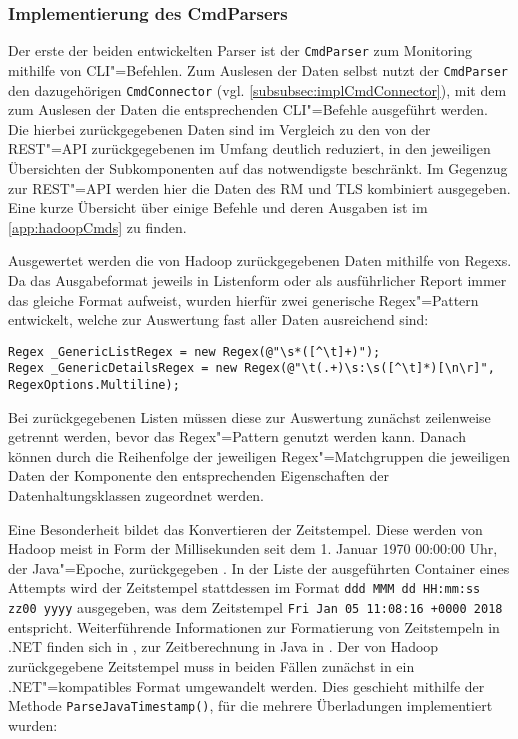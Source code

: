 \subsubsection{Implementierung des CmdParsers}
\label{subsubsec:implCmdParser}

Der erste der beiden entwickelten Parser ist der \texttt{CmdParser} zum Monitoring mithilfe von \gls{CLI}"=Befehlen.
Zum Auslesen der Daten selbst nutzt der \texttt{CmdParser} den dazugehörigen \texttt{CmdConnector} (vgl. \cref{subsubsec:implCmdConnector}), mit dem zum Auslesen der Daten die entsprechenden \gls{CLI}"=Befehle ausgeführt werden.
Die hierbei zurückgegebenen Daten sind im Vergleich zu den von der REST"=API zurückgegebenen im Umfang deutlich reduziert, in den jeweiligen Übersichten der Subkomponenten auf das notwendigste beschränkt.
Im Gegenzug zur REST"=API werden hier die Daten des \gls{RM} und \gls{TLS} kombiniert ausgegeben.
Eine kurze Übersicht über einige Befehle und deren Ausgaben ist im \cref{app:hadoopCmds} zu finden.

Ausgewertet werden die von Hadoop zurückgegebenen Daten mithilfe von \glspl{Regex}.
Da das Ausgabeformat jeweils in Listenform oder als ausführlicher Report immer das gleiche Format aufweist, wurden hierfür zwei generische Regex"=Pattern entwickelt, welche zur Auswertung fast aller Daten ausreichend sind:

\begin{lstlisting}[label=lst:cmdRegexPattern,style=cs,
caption={[Implementierte \glsentryshort{Regex}"=Pattern des CmdParsers]
    Implementierte \acrshort{Regex}"=Pattern des \texttt{CmdParser}s}]
Regex _GenericListRegex = new Regex(@"\s*([^\t]+)");
Regex _GenericDetailsRegex = new Regex(@"\t(.+)\s:\s([^\t]*)[\n\r]", RegexOptions.Multiline);
\end{lstlisting}

Bei zurückgegebenen Listen müssen diese zur Auswertung zunächst zeilenweise getrennt werden, bevor das Regex"=Pattern genutzt werden kann.
Danach können durch die Reihenfolge der jeweiligen Regex"=Matchgruppen die jeweiligen Daten der Komponente den entsprechenden Eigenschaften der Datenhaltungsklassen zugeordnet werden.

Eine Besonderheit bildet das Konvertieren der Zeitstempel.
Diese werden von Hadoop meist in Form der Millisekunden seit dem 1. Januar 1970 00:00:00 Uhr, der Java"=Epoche, zurückgegeben \cite{HadoopRmApi271,HadoopNmApi271,HadoopYarnTlServer271,JavaInstantDoc}.
In der Liste der ausgeführten Container eines Attempts wird der Zeitstempel stattdessen im Format \texttt{ddd MMM dd HH:mm:ss zz00 yyyy} ausgegeben, was \zB dem Zeitstempel \texttt{Fri Jan 05 11:08:16 +0000 2018} entspricht.
Weiterführende Informationen zur Formatierung von Zeitstempeln in .NET finden sich in \cite{CsTimeFormatStrings}, zur Zeitberechnung in Java \uA in \cite{JavaInstantDoc}.
Der von Hadoop zurückgegebene Zeitstempel muss in beiden Fällen zunächst in ein .NET"=kompatibles Format umgewandelt werden.
Dies geschieht mithilfe der Methode \texttt{ParseJavaTimestamp()}, für die mehrere Überladungen implementiert wurden:

